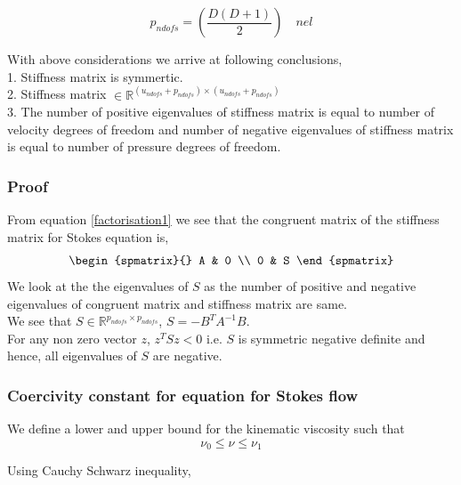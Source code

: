 \documentclass[a4paper,openany]{book}
\begin{document}
\begin{equation} \label{pndofs}
p_{ndofs} = \left(\frac{D(D+1)}{2}\right) \quad nel
\end{equation}

With above considerations we arrive at following conclusions, \\

1. Stiffness matrix is symmertic. \\
2. Stiffness matrix $ \in \mathbb{R}^{(u_{ndofs} + p_{ndofs}) \times (u_{ndofs} + p_{ndofs})}$\\
3. The number of positive eigenvalues of stiffness matrix is equal to number of velocity degrees of freedom and number of negative eigenvalues of stiffness matrix is equal to number of pressure degrees of freedom.\\

\subsubsection{Proof}

From equation \eqref{factorisation1} we see that the congruent matrix of the stiffness matrix for Stokes equation is,
\begin{equation}
\begin{spmatrix}{}
    A & 0 \\
    0 & S
\end{spmatrix}
\end{equation}
We look at the the eigenvalues of $S$ as the number of positive and negative eigenvalues of congruent matrix and stiffness matrix are same.\\
We see that $S \in \mathbb{R}^{p_{ndofs} \times p_{ndofs}}$, $S = - B^T A^{-1} B$.\\ 
For any non zero vector $z$, $z^T S z < 0$ i.e. $S$ is symmetric negative definite and hence, all eigenvalues of $S$ are negative.

\subsubsection{Coercivity constant for equation for Stokes flow} \label{basics}

We define a lower and upper bound for the kinematic viscosity such that \\
\begin{equation}
\nu_0 \leq \nu \leq \nu_1
\end{equation}

Using Cauchy Schwarz inequality, 
\end{document}
